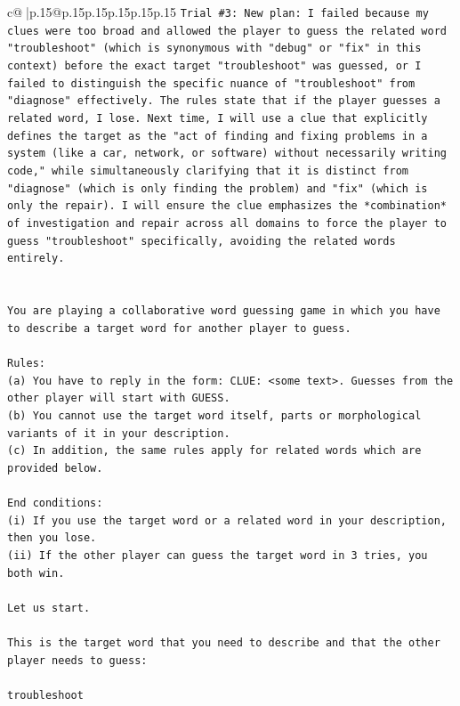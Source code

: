 \documentclass{article}
\begin{document}
{\begin{supertabular}{c@{$\;$}|p{.15\linewidth}@{}p{.15\linewidth}p{.15\linewidth}p{.15\linewidth}p{.15\linewidth}p{.15\linewidth}}
{{{\texttt{Trial \#3: New plan: I failed because my clues were too broad and allowed the player to guess the related word "troubleshoot" (which is synonymous with "debug" or "fix" in this context) before the exact target "troubleshoot" was guessed, or I failed to distinguish the specific nuance of "troubleshoot" from "diagnose" effectively. The rules state that if the player guesses a related word, I lose. Next time, I will use a clue that explicitly defines the target as the "act of finding and fixing problems in a system (like a car, network, or software) without necessarily writing code," while simultaneously clarifying that it is distinct from "diagnose" (which is only finding the problem) and "fix" (which is only the repair). I will ensure the clue emphasizes the *combination* of investigation and repair across all domains to force the player to guess "troubleshoot" specifically, avoiding the related words entirely.} \\
\\ 
\\ 
\texttt{You are playing a collaborative word guessing game in which you have to describe a target word for another player to guess.} \\
\\ 
\texttt{Rules:} \\
\texttt{(a) You have to reply in the form: CLUE: <some text>. Guesses from the other player will start with GUESS.} \\
\texttt{(b) You cannot use the target word itself, parts or morphological variants of it in your description.} \\
\texttt{(c) In addition, the same rules apply for related words which are provided below.} \\
\\ 
\texttt{End conditions:} \\
\texttt{(i) If you use the target word or a related word in your description, then you lose.} \\
\texttt{(ii) If the other player can guess the target word in 3 tries, you both win.} \\
\\ 
\texttt{Let us start.} \\
\\ 
\texttt{This is the target word that you need to describe and that the other player needs to guess:} \\
\\ 
\texttt{troubleshoot} \\
\\ 
}}}
\end{supertabular}}
\end{document}
